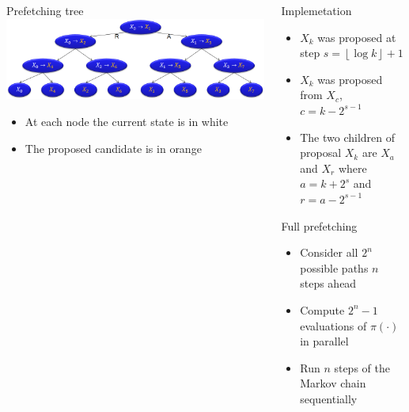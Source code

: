 \documentclass[final]{beamer}
\begin{document}
\begin{frame}[t]{}
\begin{columns}[t]
\begin{column}{0.3\textwidth}
        \begin{block}{Prefetching tree}
            \includegraphics[width=.9\textwidth]{PrefetchingTree.png}
            \begin{itemize}
            \item At each node the current state is in white
            \item The proposed candidate is in orange
            \end{itemize}
        \end{block}
     
    \end{column}
    \begin{column}{0.3\textwidth}

        \begin{block}{Implemetation}        
        \begin{itemize}
            \item $X_k$ was proposed at step $s=\left\lfloor\log k\right\rfloor+1$
            \item $X_k$ was proposed from $X_c$, $c=k-2^{s-1}$
            \item The two children of proposal $X_k$ are $X_a$ and $X_r$ where
                $a = k+2^s$ and $r = a-2^{s-1}$
        \end{itemize}
        \end{block}

        \begin{block}{Full prefetching}
            \begin{itemize}
            \item Consider all $2^n$ possible paths $n$ steps ahead
            \item Compute $2^n-1$ evaluations of $\pi(\cdot)$ in parallel
            \item Run $n$ steps of the Markov chain sequentially 
            \end{itemize}
            

\end{block}
\end{column}
\end{columns}
\end{frame}
\end{document}
